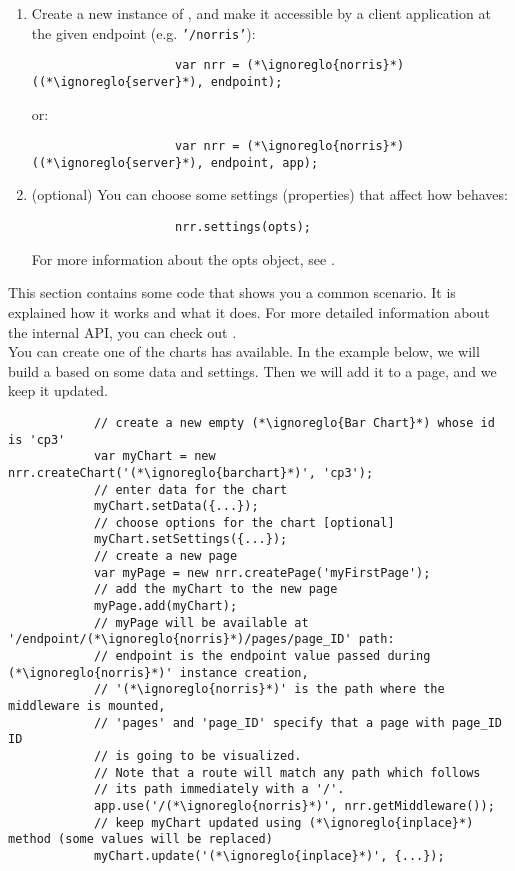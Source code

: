 \begin{itemize}
\begin{enumerate}
\begin{lstlisting}
					var (*\ignoreglo{norris}*) = require('(*\ignoreglo{norris}*)');
				\end{lstlisting}
				\item Create a new instance of , and make it accessible by a client application at the given endpoint (e.g. \texttt{'/norris'}):
				\begin{lstlisting}
					var nrr = (*\ignoreglo{norris}*)((*\ignoreglo{server}*), endpoint);
				\end{lstlisting}
				or:
				\begin{lstlisting}
					var nrr = (*\ignoreglo{norris}*)((*\ignoreglo{server}*), endpoint, app);
				\end{lstlisting}
				\item (optional) You can choose some settings (properties) that affect how  behaves:
				\begin{lstlisting}
					nrr.settings(opts);
				\end{lstlisting}
				For more information about the opts object, see .
			\end{enumerate}
		\end{itemize}
		This section contains some code that shows you a common scenario. It is explained how it works and what it does. For more detailed information about the internal API, you can check out .\\
		You can create one of the charts  has available. In the example below, we will build a  based on some data and settings. Then we will add it to a page, and we keep it updated.
		\begin{lstlisting}
			// create a new empty (*\ignoreglo{Bar Chart}*) whose id is 'cp3'
			var myChart = new nrr.createChart('(*\ignoreglo{barchart}*)', 'cp3');
			// enter data for the chart
			myChart.setData({...});
			// choose options for the chart [optional]
			myChart.setSettings({...});
			// create a new page
			var myPage = new nrr.createPage('myFirstPage');
			// add the myChart to the new page
			myPage.add(myChart);
			// myPage will be available at '/endpoint/(*\ignoreglo{norris}*)/pages/page_ID' path:
			// endpoint is the endpoint value passed during (*\ignoreglo{norris}*)' instance creation,
			// '(*\ignoreglo{norris}*)' is the path where the middleware is mounted, 
			// 'pages' and 'page_ID' specify that a page with page_ID ID 
			// is going to be visualized. 
			// Note that a route will match any path which follows 
			// its path immediately with a '/'.
			app.use('/(*\ignoreglo{norris}*)', nrr.getMiddleware());
			// keep myChart updated using (*\ignoreglo{inplace}*) method (some values will be replaced)
			myChart.update('(*\ignoreglo{inplace}*)', {...});
		\end{lstlisting}

